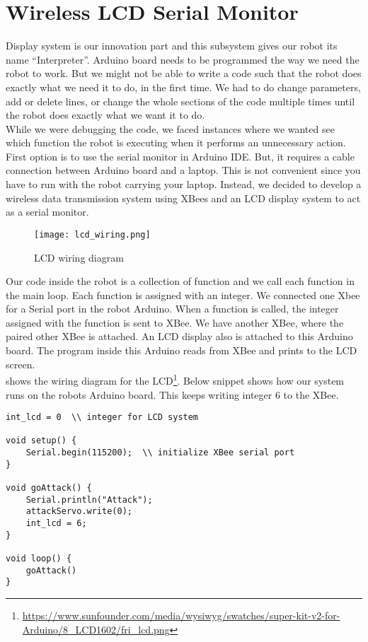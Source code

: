 \documentclass[11pt, letterpaper, oneside]{article}
\begin{document}
\newpage
\section{Wireless LCD Serial Monitor}
Display system is our innovation part and this subsystem gives our robot its name ``Interpreter''. Arduino board needs to be programmed the way we need the robot to work. But we might not be able to write a code such that the robot does exactly what we need it to do, in the first time. We had to do change parameters, add or delete lines, or change the whole sections of the code multiple times until the robot does exactly what we want it to do. \\

While we were debugging the code, we faced instances where we wanted see which function the robot is executing when it performs an unnecessary action. First option is to use the serial monitor in Arduino IDE. But, it requires a cable connection between Arduino board and a laptop. This is not convenient since you have to run with the robot carrying your laptop. Instead, we decided to develop a wireless data transmission system using XBees and an LCD display system to act as a serial monitor.\\

\begin{figure}[bth]
	\begin{center}
		\texttt{[image: lcd\_wiring.png]}
		\caption{LCD wiring diagram}
		\label{fig:lcd_wiring}
	\end{center}
\end{figure}

Our code inside the robot is a collection of function and we call each function in the main loop. Each function is assigned with an integer. We connected one Xbee for a Serial port in the robot Arduino. When a function is called, the integer assigned with the function is sent to XBee. We have another XBee, where the paired other XBee is attached. An LCD display also is attached to this Arduino board. The program inside this Arduino reads from XBee and prints to the LCD screen.\\


 shows the wiring diagram for the LCD\footnote{\url{https://www.sunfounder.com/media/wysiwyg/swatches/super-kit-v2-for-Arduino/8_LCD1602/fri_lcd.png}}. Below snippet shows how our system runs on the robots Arduino board. This keeps writing integer 6 to the XBee.
\newpage
\begin{verbatim}
int_lcd = 0  \\ integer for LCD system

void setup() {
    Serial.begin(115200);  \\ initialize XBee serial port
}

void goAttack() {
    Serial.println("Attack");
    attackServo.write(0);
    int_lcd = 6;
}

void loop() {
    goAttack()
}
\end{verbatim}
\end{document}
